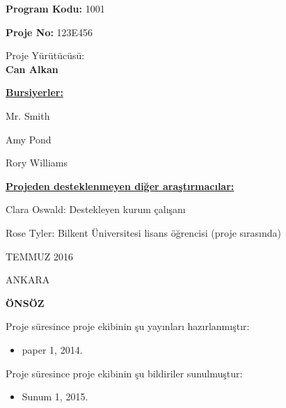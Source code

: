 \documentclass[11pt]{article}
\begin{document}
\bigskip


\thispagestyle{empty}


\begin{center}
\medskip
{\LARGE \textbf{Program Kodu:} 1001}

\bigskip
{\LARGE \textbf{Proje No:} 123E456}

\bigskip
{\LARGE Proje Yürütücüsü:\\
\textbf{Can Alkan}}

\end{center}

\bigskip


\bigskip
\noindent
{\large
\noindent
\underline{\bf Bursiyerler:}

\noindent
Mr. Smith

\noindent
Amy Pond

\noindent
Rory Williams

\noindent \underline{\bf Projeden desteklenmeyen diğer araştırmacılar:}

\noindent
Clara Oswald:  Destekleyen kurum çalışanı

\noindent
Rose Tyler: Bilkent Üniversitesi lisans öğrencisi (proje sırasında)


}



\bigskip





\begin{center}
{\Large TEMMUZ 2016

\vspace{1mm}
ANKARA}
\end{center}


\linespread{1.5}

\newpage\setlength{\parskip}{3mm} 
\onehalfspacing
\bigskip
{}
\setcounter{page}{1}
\begin{center}
{\LARGE \bf ÖNSÖZ}
\end{center}


Proje süresince proje ekibinin şu yayınları hazırlanmıştır: 

\begin{itemize}
\item paper 1, 2014.
  
\end{itemize}

Proje süresince proje ekibinin şu bildiriler sunulmuştur:
 
\begin{itemize}
\item Sunum 1, 2015.
  
\end{itemize}
\end{document}
